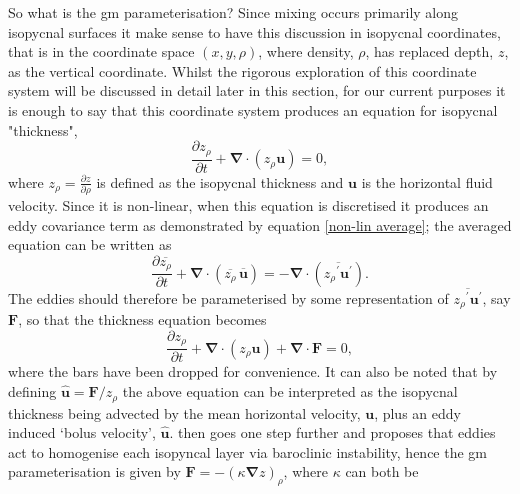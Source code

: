 \documentclass[10pt,a4paper]{article}
\newcommand*\mean[1]{\overline{#1}}
\newcommand*\res[1]{{#1}^{\prime}}
\begin{document}
 So what is the \gls{gm} parameterisation? Since mixing occurs primarily
 along isopycnal surfaces it make sense to have this discussion in
 isopycnal coordinates, that is in the coordinate space $(x,y,\rho)$,
  where density, $\rho$, has replaced depth, $z$, as the vertical
  coordinate. Whilst the rigorous exploration of this coordinate system
  will be discussed in detail later in this section, for our current purposes 
  it is enough to say that this coordinate system produces an equation
  for isopycnal "thickness",
  \begin{equation}
  \label{cont}
  \frac{\partial z_{\rho}}{\partial t} + \boldsymbol{\nabla}\cdot\left(z_{\rho}\boldsymbol{u}\right) = 0,
  \end{equation}
  where $z_{\rho} = \frac{\partial z}{\partial \rho}$ is defined as the
   isopycnal thickness and $\boldsymbol{u}$ is the horizontal fluid
   velocity. Since it is non-linear, when this equation is discretised
   it produces an eddy covariance term as demonstrated by equation
   \ref{non-lin average}; the averaged equation can be written as
     \begin{equation}
     \frac{\partial \mean{z_{\rho}}}{\partial t} + \boldsymbol{\nabla}\cdot\left(\mean{z_{\rho}} \, \mean{\boldsymbol{u}}\right) = - \boldsymbol{\nabla}\cdot\left(\mean{\res{z_{\rho}} \res{\boldsymbol{u}}}\right).
     \label{meancont}
     \end{equation}
   The eddies should therefore be parameterised by some representation
   of $\mean{\res{z_{\rho}} \res{\boldsymbol{u}}}$, say $\boldsymbol{F}$,
   so that the thickness equation becomes
     \begin{equation}
     \frac{\partial z_{\rho}}{\partial t} + \boldsymbol{\nabla}\cdot\left(z_{\rho}\boldsymbol{u}\right) + \boldsymbol{\nabla}\cdot\boldsymbol{F} = 0,
     \label{thicknessgeneralparam}
     \end{equation}
    where the bars have been dropped for convenience. It can also 
    be noted that by defining $\hat{\boldsymbol{u}} = \boldsymbol{F}/z_{\rho}$ the above equation can be interpreted as
    the isopycnal thickness
    being advected by the mean horizontal velocity, $\boldsymbol{u}$, 
    plus an eddy induced
    `bolus velocity', $\hat{\boldsymbol{u}}$. \cite{gent1990} then goes one
    step further and proposes that eddies act to homogenise each
    isopyncal layer via baroclinic instability, hence the 
    \gls{gm} parameterisation is given by $\boldsymbol{F} = - \left(\kappa
    \boldsymbol{\nabla} z \right)_{\rho}$, where $\kappa$ can both be
\end{document}
